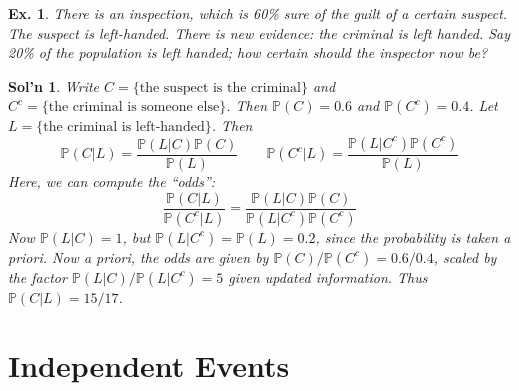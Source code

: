 \documentclass[12pt, a4paper]{book}
\renewcommand{\Pr}{\mathbb{P}}
\newtheorem{example}[theorem]{Ex.}
\theoremstyle{nonumberplain}
\newtheorem{solution}{Sol'n}
\begin{document}
\begin{example}
    There is an inspection, which is 60\% sure of the guilt of a certain suspect.
    The suspect is left-handed.
    There is new evidence: the criminal is left handed.
    Say 20\% of the population is left handed; how certain should the inspector now be?
\end{example}
\begin{solution}
    Write $C=\{\text{the suspect is the criminal}\}$ and $C^c=\{\text{the criminal is someone else}\}$.
    Then $\Pr(C)=0.6$ and $\Pr(C^c)=0.4$.
    Let $L=\{\text{the criminal is left-handed}\}$.
    Then
    \[\Pr(C|L)=\frac{\Pr(L|C)\Pr(C)}{\Pr(L)}\qquad\Pr(C^c|L)=\frac{\Pr(L|C^c)\Pr(C^c)}{\Pr(L)}\]
    Here, we can compute the ``odds'':
    \[\frac{\Pr(C|L)}{\Pr(C^c|L)}=\frac{\Pr(L|C)\Pr(C)}{\Pr(L|C^c)\Pr(C^c)}\]
    Now $\Pr(L|C)=1$, but $\Pr(L|C^c)=\Pr(L)=0.2$, since the probability is taken a priori.
    Now a priori, the odds are given by $\Pr(C)/\Pr(C^c)=0.6/0.4$, scaled by the factor $\Pr(L|C)/\Pr(L|C^c)=5$ given updated information.
    Thus $\Pr(C|L)=15/17$.
\end{solution}
\section{Independent Events}
\end{document}
